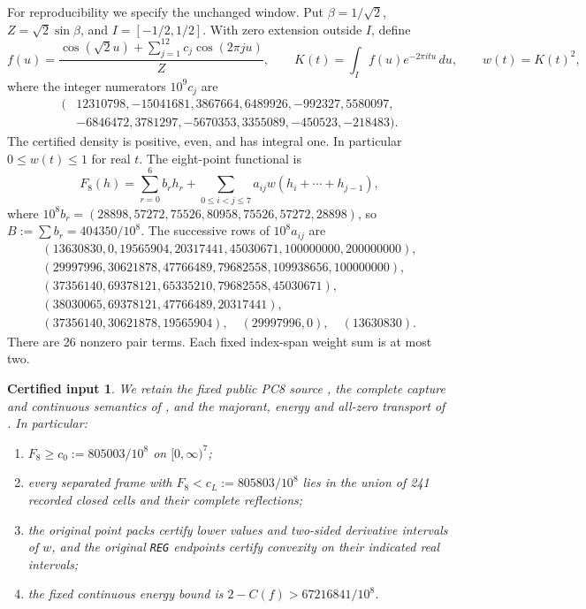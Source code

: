 \documentclass[11pt,a4paper]{article}
\newtheorem{inputclaim}[theorem]{Certified input}
\begin{document}
For reproducibility we specify the unchanged window. Put
$\beta=1/\sqrt2$, $Z=\sqrt2\sin\beta$, and $I=[-1/2,1/2]$.
With zero extension outside $I$, define
\[
 f(u)=\frac{\cos(\sqrt2u)+\sum_{j=1}^{12}c_j\cos(2\pi ju)}{Z},
 \qquad K(t)=\int_I f(u)e^{-2\pi itu}\,du,\qquad w(t)=K(t)^2,
\]
where the integer numerators $10^9c_j$ are
\[
\begin{split}
(&12310798,-15041681,3867664,6489926,-992327,5580097,\\
 &-6846472,3781297,-5670353,3355089,-450523,-218483).
\end{split}
\]
The certified density is positive, even, and has integral one. In
particular $0\le w(t)\le1$ for real $t$. The eight-point functional is
\[
 F_8(h)=\sum_{r=0}^6b_rh_r+
   \sum_{0\le i<j\le7}a_{ij}w(h_i+\cdots+h_{j-1}),
\]
where $10^8b_r=(28898,57272,75526,80958,75526,57272,28898)$,
so $B:=\sum b_r=404350/10^8$. The successive rows of $10^8a_{ij}$ are
\[
\begin{array}{l}
(13630830,0,19565904,20317441,45030671,100000000,200000000),\\
(29997996,30621878,47766489,79682558,109938656,100000000),\\
(37356140,69378121,65335210,79682558,45030671),\\
(38030065,69378121,47766489,20317441),\\
(37356140,30621878,19565904),\quad(29997996,0),\quad(13630830).
\end{array}
\]
There are 26 nonzero pair terms. Each fixed index-span weight sum is
at most two.

\begin{inputclaim}\label{in:fixed}
We retain the fixed public PC8 source \cite{PC8}, the complete capture
and continuous semantics of \cite{Expanded}, and the majorant, energy
and all-zero transport of \cite{Joint,Lossless}. In particular:
\begin{enumerate}
\item $F_8\ge c_0:=805003/10^8$ on $[0,\infty)^7$;
\item every separated frame with $F_8<c_L:=805803/10^8$ lies in
the union of 241 recorded closed cells and their complete reflections;
\item the original point packs certify lower values and two-sided
derivative intervals of $w$, and the original \texttt{REG} endpoints
certify convexity on their indicated real intervals;
\item the fixed continuous energy bound is $2-C(f)>67216841/10^8$.
\end{enumerate}
\end{inputclaim}
\end{document}
